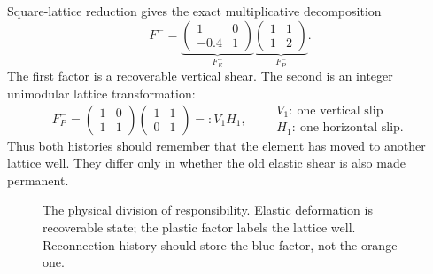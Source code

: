 \documentclass[9pt,a4paper]{extarticle}
\newcommand{\Fminus}{F^-}
\newcommand{\Em}{F_E^-}
\newcommand{\Pm}{F_P^-}
\begin{document}
Square-lattice reduction gives the exact multiplicative decomposition
\begin{equation}
\Fminus=
\underbrace{\begin{pmatrix}1&0\\-0.4&1\end{pmatrix}}_{\displaystyle \Em}
\underbrace{\begin{pmatrix}1&1\\1&2\end{pmatrix}}_{\displaystyle \Pm}.
\label{eq:decomp}
\end{equation}
The first factor is a recoverable vertical shear.  The second is an integer
unimodular lattice transformation:
\begin{equation}
\Pm=
\begin{pmatrix}1&0\\1&1\end{pmatrix}
\begin{pmatrix}1&1\\0&1\end{pmatrix}
=:V_1H_1,
\qquad
\substack{V_1:\ \text{one vertical slip}\\
           H_1:\ \text{one horizontal slip}.}
\label{eq:plastic}
\end{equation}
Thus both histories should remember that the element has moved to another
lattice well.  They differ only in whether the old elastic shear is also made
permanent.

\begin{figure}[h]
\centering
{}
\caption{The physical division of responsibility.  Elastic deformation is
recoverable state; the plastic factor labels the lattice well.  Reconnection
history should store the blue factor, not the orange one.}
\label{fig:parts}
\end{figure}
\end{document}
